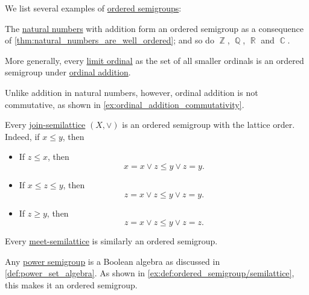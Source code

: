 \begin{example}\label{ex:def:ordered_semigroup}
  We list several examples of \hyperref[def:ordered_semigroup]{ordered semigroups}:

  \begin{thmenum}
     The \hyperref[def:natural_numbers]{natural numbers} with addition form an ordered semigroup as a consequence of \cref{thm:natural_numbers_are_well_ordered}; and so do \( \BbbZ \), \( \BbbQ \), \( \BbbR \) and \( \BbbC \).

     More generally, every \hyperref[def:successor_and_limit_ordinal]{limit ordinal} as the set of all smaller ordinals is an ordered semigroup under \hyperref[def:ordinal_addition]{ordinal addition}.

    Unlike addition in natural numbers, however, ordinal addition is not commutative, as shown in \cref{ex:ordinal_addition_commutativity}.

     Every \hyperref[def:semilattice]{join-semilattice} \( (X, \vee) \) is an ordered semigroup with the lattice order. Indeed, if \( x \leq y \), then
    \begin{itemize}
      \item If \( z \leq x \), then
      \begin{equation*}
        x = x \vee z \leq y \vee z = y.
      \end{equation*}

      \item If \( x \leq z \leq y \), then
      \begin{equation*}
        z = x \vee z \leq y \vee z = y.
      \end{equation*}

      \item If \( z \geq y \), then
      \begin{equation*}
        z = x \vee z \leq y \vee z = z.
      \end{equation*}
    \end{itemize}

    Every \hyperref[def:semilattice]{meet-semilattice} is similarly an ordered semigroup.

     Any \hyperref[def:power_semigroup]{power semigroup} is a Boolean algebra as discussed in \cref{def:power_set_algebra}. As shown in \cref{ex:def:ordered_semigroup/semilattice}, this makes it an ordered semigroup.
  \end{thmenum}
\end{example}

